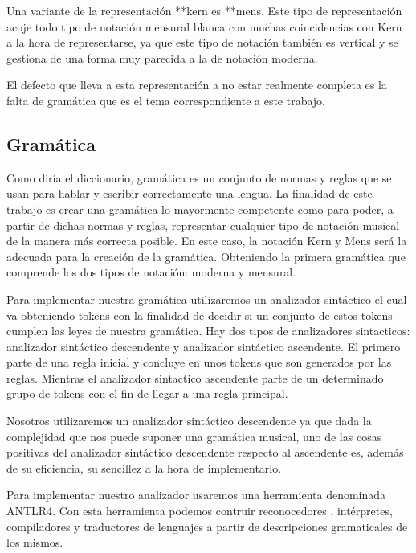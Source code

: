 \documentclass{article}
\begin{document}

Una variante de la representación **kern\cite{kern} es **mens\cite{mens}. Este tipo de representación acoje todo tipo de notación mensural blanca
con muchas coincidencias con Kern a la hora de representarse, ya que este tipo de notación también es vertical y se gestiona
de una forma muy parecida a la de notación moderna.

El defecto que lleva a esta representación a no estar realmente completa es la falta de gramática que es el tema correspondiente
a este trabajo.

\subsection{Gramática}
    Como diría el diccionario, gramática es un conjunto de normas y reglas que se usan para hablar y escribir correctamente una lengua.
La finalidad de este trabajo es crear una gramática lo mayormente competente como para poder, a partir de dichas normas y reglas, representar
cualquier tipo de notación musical de la manera más correcta posible. En este caso, la notación Kern y Mens será la adecuada para la creación
de la gramática.
    Obteniendo la primera gramática que comprende los dos tipos de notación: moderna y mensural.

Para implementar nuestra gramática utilizaremos un analizador sintáctico el cual va obteniendo tokens con la finalidad de
decidir si un conjunto de estos tokens cumplen las leyes de nuestra gramática. Hay dos tipos de analizadores sintacticos:
analizador sintáctico descendente y analizador sintáctico ascendente. El primero parte de una regla inicial y concluye en unos
tokens que son generados por las reglas. Mientras el analizador sintactico ascendente parte de un determinado grupo de tokens con
el fin de llegar a una regla principal.

Nosotros utilizaremos un analizador sintáctico descendente ya que dada la complejidad que nos puede suponer una gramática musical,
uno de las cosas positivas del analizador sintáctico descendente respecto al ascendente es, además de su eficiencia, su sencillez a
la hora de implementarlo. 

Para implementar nuestro analizador usaremos una herramienta denominada ANTLR4\cite{antlr4}. Con esta herramienta podemos contruir reconocedores
, intérpretes, compiladores y traductores de lenguajes a partir de descripciones gramaticales de los mismos.
\end{document}
